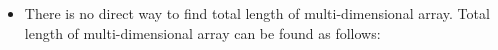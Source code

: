 \begin{flushleft}
\begin{itemize}
		\bigskip
		
		\item There is no direct way to find total length of multi-dimensional array. Total length of multi-dimensional array can be found as follows:
		
				
		
	\end{itemize}
	
\end{flushleft}
\newpage
